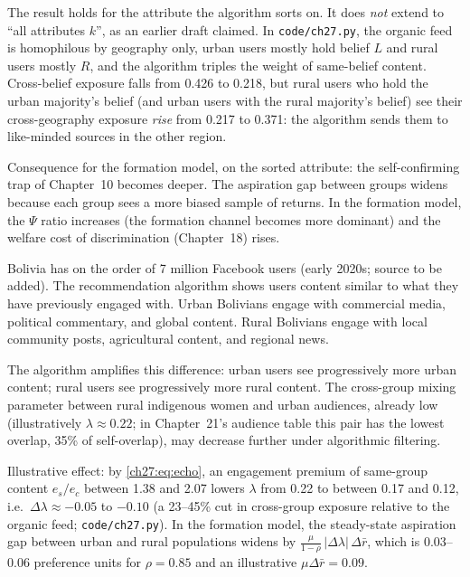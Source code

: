 \documentclass[../structural_economics_book.tex]{subfiles}
\begin{document}
The result holds for the attribute the algorithm sorts on. It does \emph{not} extend to ``all attributes $k$'', as an earlier draft claimed. In \texttt{code/ch27.py}, the organic feed is homophilous by geography only, urban users mostly hold belief $L$ and rural users mostly $R$, and the algorithm triples the weight of same-belief content. Cross-belief exposure falls from 0.426 to 0.218, but rural users who hold the urban majority's belief (and urban users with the rural majority's belief) see their cross-geography exposure \emph{rise} from 0.217 to 0.371: the algorithm sends them to like-minded sources in the other region.

Consequence for the formation model, on the sorted attribute: the self-confirming trap of Chapter~10 becomes deeper. The aspiration gap between groups widens because each group sees a more biased sample of returns. In the formation model, the $\Psi$ ratio increases (the formation channel becomes more dominant) and the welfare cost of discrimination (Chapter~18) rises.

\begin{example}\label{ch27:ex:facebook}
Bolivia has on the order of 7 million Facebook users (early 2020s; source to be added). The recommendation algorithm shows users content similar to what they have previously engaged with. Urban Bolivians engage with commercial media, political commentary, and global content. Rural Bolivians engage with local community posts, agricultural content, and regional news.

The algorithm amplifies this difference: urban users see progressively more urban content; rural users see progressively more rural content. The cross-group mixing parameter between rural indigenous women and urban audiences, already low (illustratively $\lambda \approx 0.22$; in Chapter~21's audience table this pair has the lowest overlap, 35\% of self-overlap), may decrease further under algorithmic filtering.

Illustrative effect: by \eqref{ch27:eq:echo}, an engagement premium of same-group content $e_s/e_c$ between 1.38 and 2.07 lowers $\lambda$ from 0.22 to between 0.17 and 0.12, i.e.\ $\Delta\lambda \approx -0.05$ to $-0.10$ (a 23--45\% cut in cross-group exposure relative to the organic feed; \texttt{code/ch27.py}). In the formation model, the steady-state aspiration gap between urban and rural populations widens by $\frac{\mu}{1-\rho}\,|\Delta\lambda|\,\Delta\bar{r}$, which is 0.03--0.06 preference units for $\rho = 0.85$ and an illustrative $\mu\Delta\bar{r} = 0.09$.
\end{example}
\end{document}
